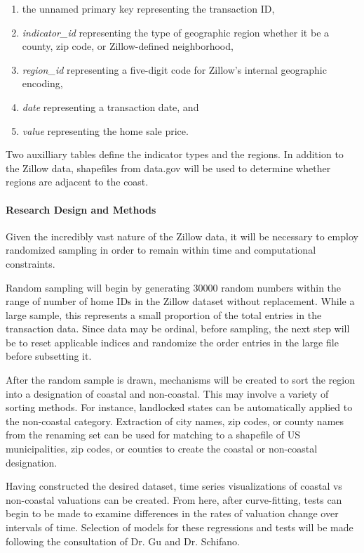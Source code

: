 \documentclass[12pt]{article}
\begin{document}
\begin{enumerate}
    \item the unnamed primary key representing the transaction ID,
    \item \textit{indicator\_id} representing the type of geographic region whether it be a county, zip code, or Zillow-defined neighborhood,
    \item \textit{region\_id} representing a five-digit code for Zillow's internal geographic encoding,
    \item \textit{date} representing a transaction date, and
    \item \textit{value} representing the home sale price.
\end{enumerate}

Two auxilliary tables define the indicator types and the regions. In addition to the Zillow data, shapefiles from data.gov will be used to determine whether regions are adjacent to the coast.

\paragraph{Research Design and Methods}

Given the incredibly vast nature of the Zillow data, it will be necessary to employ randomized sampling in order to remain within time and computational constraints. 

Random sampling will begin by generating $30000$ random numbers within the range of number of home IDs in the Zillow dataset without replacement. While a large sample, this represents a small proportion of the total entries in the transaction data. Since data may be ordinal, before sampling, the next step will be to reset applicable indices and randomize the order entries in the large file before subsetting it. 

After the random sample is drawn, mechanisms will be created to sort the region into a designation of coastal and non-coastal. This may involve a variety of sorting methods. For instance, landlocked states can be automatically applied to the non-coastal category. Extraction of city names, zip codes, or county names from the renaming set can be used for matching to a shapefile of US municipalities, zip codes, or counties to create the coastal or non-coastal designation. 

Having constructed the desired dataset, time series visualizations of coastal vs non-coastal valuations can be created. From here, after curve-fitting, tests can begin to be made to examine differences in the rates of valuation change over intervals of time. Selection of models for these regressions and tests will be made following the consultation of Dr. Gu and Dr. Schifano. 
\end{document}
